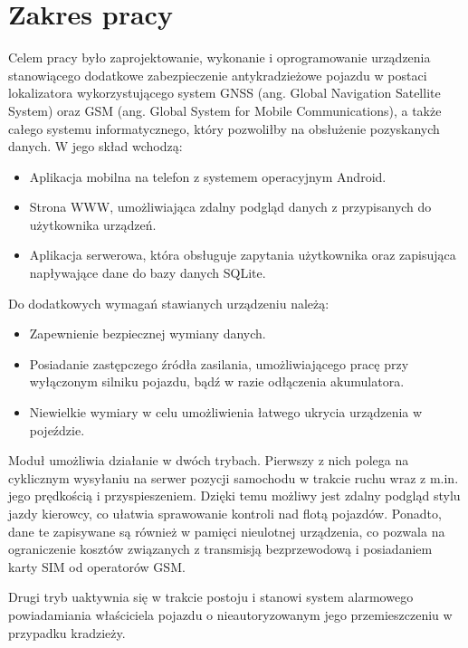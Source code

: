 \section{Zakres pracy}
\label{project_sketch}
Celem pracy było zaprojektowanie, wykonanie i oprogramowanie urządzenia stanowiącego dodatkowe zabezpieczenie antykradzieżowe pojazdu w postaci lokalizatora wykorzystującego system GNSS  (ang. Global Navigation Satellite System) oraz GSM (ang. Global System for Mobile Communications), a także całego systemu informatycznego, który pozwoliłby na obsłużenie pozyskanych danych. W jego skład wchodzą:

\begin{itemize}
\item Aplikacja mobilna na telefon z systemem operacyjnym Android.
\item Strona WWW, umożliwiająca zdalny podgląd danych z przypisanych do użytkownika urządzeń.
\item Aplikacja serwerowa, która obsługuje zapytania użytkownika oraz zapisująca napływające dane do bazy danych SQLite.
\end{itemize}

Do dodatkowych wymagań stawianych urządzeniu należą:

\begin{itemize}
\item Zapewnienie bezpiecznej wymiany danych.
\item Posiadanie zastępczego źródła zasilania, umożliwiającego pracę przy wyłączonym silniku pojazdu, bądź w razie odłączenia akumulatora.
\item Niewielkie wymiary w celu umożliwienia łatwego ukrycia urządzenia w pojeździe. 
\end{itemize}

Moduł umożliwia działanie w dwóch trybach. Pierwszy z nich polega na cyklicznym wysyłaniu na serwer pozycji samochodu w trakcie ruchu wraz z m.in. jego prędkością i przyspieszeniem. Dzięki temu możliwy jest zdalny podgląd stylu jazdy kierowcy, co ułatwia sprawowanie kontroli nad flotą pojazdów. Ponadto, dane te zapisywane są również w pamięci nieulotnej urządzenia,  co pozwala na ograniczenie kosztów związanych z transmisją bezprzewodową i posiadaniem karty SIM od operatorów GSM. 

Drugi tryb uaktywnia się w trakcie postoju i stanowi system alarmowego powiadamiania właściciela pojazdu o nieautoryzowanym jego przemieszczeniu w przypadku kradzieży.

